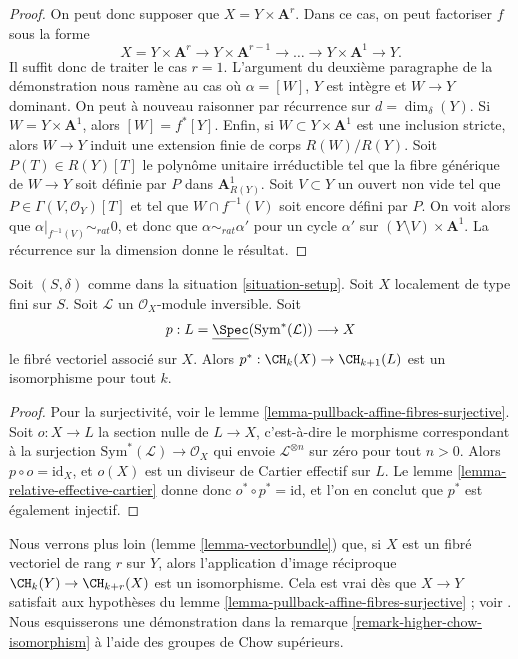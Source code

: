 \begin{proof}
\medskip\noindent
On peut donc supposer que $X = Y \times \mathbf{A}^r$.
Dans ce cas, on peut factoriser $f$ sous la forme
$$
X = Y \times \mathbf{A}^r \to
Y \times \mathbf{A}^{r - 1} \to \ldots \to
Y \times \mathbf{A}^1 \to Y.
$$
Il suffit donc de traiter le cas $r = 1$. L'argument du
deuxième paragraphe de la démonstration nous ramène au cas où
$\alpha = [W]$, $Y$ est intègre et $W \to Y$ dominant.
On peut à nouveau raisonner par récurrence sur $d = \dim_\delta(Y)$.
Si $W = Y \times \mathbf{A}^1$, alors $[W] = f^*[Y]$.
Enfin, si $W \subset Y \times \mathbf{A}^1$ est une inclusion stricte,
alors $W \to Y$ induit une extension finie de corps $R(W)/R(Y)$.
Soit $P(T) \in R(Y)[T]$ le polynôme unitaire irréductible tel
que la fibre générique de $W \to Y$ soit définie par $P$ dans
$\mathbf{A}^1_{R(Y)}$. Soit $V \subset Y$ un ouvert non vide tel
que $P \in \Gamma(V, \mathcal{O}_Y)[T]$ et tel que
$W \cap f^{-1}(V)$ soit encore défini par $P$. On voit alors que
$\alpha|_{f^{-1}(V)} \sim_{rat} 0$, et donc que $\alpha \sim_{rat} \alpha'$
pour un cycle $\alpha'$ sur $(Y \setminus V) \times \mathbf{A}^1$.
La récurrence sur la dimension donne le résultat.
\end{proof}

\begin{lemma}
\label{lemma-linebundle}
Soit $(S, \delta)$ comme dans la situation \ref{situation-setup}.
Soit $X$ localement de type fini sur $S$.
Soit $\mathcal{L}$ un $\mathcal{O}_X$-module inversible.
Soit
$$
p :
L = \underline{\Spec}(\text{Sym}^*(\mathcal{L}))
\longrightarrow
X
$$
le fibré vectoriel associé sur $X$.
Alors $p^* : \CH_k(X) \to \CH_{k + 1}(L)$ est un isomorphisme pour tout $k$.
\end{lemma}

\begin{proof}
Pour la surjectivité, voir le lemme \ref{lemma-pullback-affine-fibres-surjective}.
Soit $o : X \to L$ la section nulle de $L \to X$, c'est-à-dire le morphisme
correspondant à la surjection $\text{Sym}^*(\mathcal{L}) \to \mathcal{O}_X$
qui envoie $\mathcal{L}^{\otimes n}$ sur zéro pour tout $n > 0$.
Alors $p \circ o = \text{id}_X$, et $o(X)$ est un diviseur de Cartier
effectif sur $L$. Le lemme \ref{lemma-relative-effective-cartier}
donne donc $o^* \circ p^* = \text{id}$, et l'on en conclut que $p^*$ est
également injectif.
\end{proof}

\begin{remark}
\label{remark-when-isomorphism}
Nous verrons plus loin (lemme \ref{lemma-vectorbundle}) que, si $X$ est un
fibré vectoriel de rang $r$ sur $Y$, alors l'application d'image réciproque
$\CH_k(Y) \to \CH_{k + r}(X)$
est un isomorphisme. Cela est vrai dès que $X \to Y$ satisfait
aux hypothèses du lemme \ref{lemma-pullback-affine-fibres-surjective} ; voir
\cite[Lemme 2.2]{Totaro-group}. Nous esquisserons une démonstration dans la
remarque \ref{remark-higher-chow-isomorphism} à l'aide des groupes de Chow supérieurs.
\end{remark}

